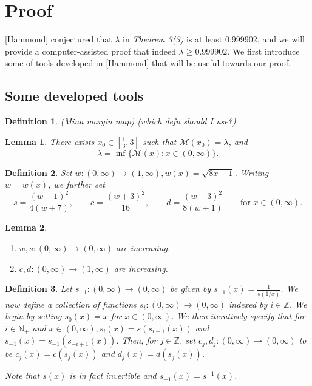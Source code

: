 \documentclass{article}
\newtheorem{definition}{Definition}
\newtheorem{lemma}{Lemma}
\newcommand*{\N}{\mathbb{N}}
\newcommand*{\M}{\mathcal{M}}
\begin{document}
\section{\centering Proof}
[Hammond] conjectured that $\lambda$ in \emph{Theorem 3(3)} is at least 0.999902, and we will
provide a computer-assisted proof that indeed $\lambda \geq 0.999902$. We first introduce some of tools developed in [Hammond] that will be useful towards our proof.

\subsection{\centering Some developed tools}
\begin{definition}(Mina margin map)
    (which defn should I use?)
\end{definition}

\begin{lemma}
    There exists $x_0\in[\frac{1}{3},3]$ such that $\M(x_0)=\lambda$, and
    $$\lambda=\inf\{\M(x):x\in(0,\infty)\}.$$
\end{lemma}

\begin{definition}
    Set $w:(0,\infty)\to(1,\infty), w(x)=\sqrt{8x+1}$. Writing $w=w(x)$, we further set
    $$s=\frac{(w-1)^2}{4(w+7)},\qquad c=\frac{(w+3)^2}{16}, \qquad d=\frac{(w+3)^2}{8(w+1)} \qquad
    \text{for } x\in(0,\infty).$$ 
\end{definition}

\begin{lemma}\indent
    \begin{enumerate}[label=(\arabic*)]
        \item $w, s:(0,\infty)\to(0,\infty)$ are increasing.
        \item $c, d:(0,\infty)\to(1,\infty)$ are increasing.
    \end{enumerate}
\end{lemma}

\begin{definition}
    Let $s_{-1}:(0,\infty)\to(0,\infty)$ be given by $s_{-1}(x)=\frac{1}{s(1/x)}$. We now define a
    collection of functions $s_i:(0,\infty)\to(0,\infty)$ indexed by $i\in\mathbb{Z}$. We begin by
    setting $s_0(x)=x$ for $x\in(0,\infty)$. We then iteratively specify that for $i\in\N_+$
    and $x\in(0,\infty), s_i(x)=s(s_{i-1}(x))$ and $s_{-1}(x)=s_{-1}(s_{-i+1}(x))$. Then, for $j\in
    \mathbb{Z}$, set $c_j, d_j:(0,\infty)\to(0,\infty)$ to be $c_j(x)=c(s_j(x))$ and
    $d_j(x)=d(s_j(x))$.

    Note that $s(x)$ is in fact invertible and $s_{-1}(x)=s^{-1}(x)$.
\end{definition}
\end{document}
